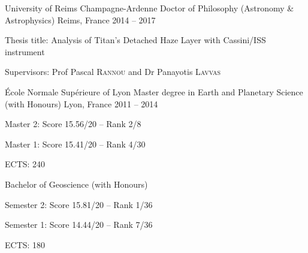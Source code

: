 
\begin{cventries}

  \cventry
    {University of Reims Champagne-Ardenne}
    {Doctor of Philosophy (Astronomy \& Astrophysics)}
    {Reims, France}
    {2014 -- 2017}
    {
      \begin{cvitems}
        \item{Thesis title: Analysis of Titan’s Detached Haze Layer with Cassini/ISS instrument}
        \item{Supervisors: Prof Pascal \textsc{Rannou} and Dr Panayotis \textsc{Lavvas}}
      \end{cvitems}
      \vspace{1em}
    }

  \cventry
    {École Normale Supérieure of Lyon}
    {Master degree in Earth and Planetary Science (with Honours)}
    {Lyon, France}
    {2011 -- 2014}
    {
      \begin{cvitems}
        \item{Master 2: Score 15.56/20 -- Rank 2/8}
        \item{Master 1: Score 15.41/20 -- Rank 4/30}
        \item{ECTS: 240}
      \end{cvitems}
    }

  \cventry
    {}
    {Bachelor of Geoscience (with Honours)}
    {}{}
    {
      \begin{cvitems}
        \item{Semester 2: Score 15.81/20 -- Rank 1/36}
        \item{Semester 1: Score 14.44/20 -- Rank 7/36}
        \item{ECTS: 180}
      \end{cvitems}
    }

\end{cventries}

